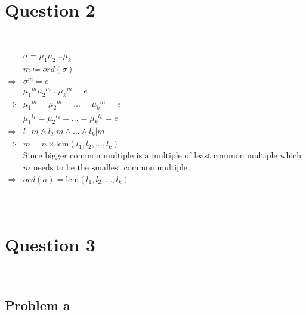 \documentclass{article}
\begin{document}
\newpage

\section*{Question 2}

~

\begin{equation*}
    \begin{split}
        &\sigma=\mu_1\mu_2...\mu_k\\
        &m\coloneqq ord(\sigma)\\
        \Rightarrow&\sigma^m=e\\
        &{\mu_1}^m{\mu_2}^m...{\mu_k}^m=e\\
        \Rightarrow&{\mu_1}^m={\mu_2}^m=...={\mu_k}^m=e\\
        &{\mu_1}^{l_1}={\mu_2}^{l_2}=...={\mu_k}^{l_k}=e\\
        \Rightarrow&l_1|m\land l_2|m\land...\land l_k|m\\
        \Rightarrow&m=n\times\text{lcm}(l_1,l_2,...,l_k)\\
        &\text{Since bigger common multiple is a multiple of least common multiple which cannot be the order}\\
        &m\text{ needs to be the smallest common multiple}\\
        \Rightarrow&ord(\sigma)=\text{lcm}(l_1,l_2,...,l_k)\\
    \end{split}
\end{equation*}

~

\newpage

\section*{Question 3}

~

\subsection*{Problem a}

~
\end{document}
